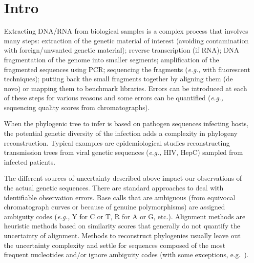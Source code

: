 \documentclass[
]{article}
\newcommand{\eg}{\textit{e.g.,}\xspace}
\begin{document}
\hypertarget{intro}{%
\section{Intro}\label{intro}}

Extracting DNA/RNA from biological samples is a complex process that
involves many steps: extraction of the genetic material of interest
(avoiding contamination with foreign/unwanted genetic material); reverse
transcription (if RNA); DNA fragmentation of the genome into smaller
segments; amplification of the fragmented sequences using PCR;
sequencing the fragments (\eg with fluorescent techniques); putting back
the small fragments together by aligning them (de novo) or mapping them
to benchmark libraries. Errors can be introduced at each of these steps
for various reasons
\citep[\citet{oraweAccountingUncertaintyDNA2015}]{beerenwinkelUltradeepSequencingAnalysis2011}
and some errors can be quantified (\eg sequencing quality scores from
chromatographs).

When the phylogenic tree to infer is based on pathogen sequences
infecting hosts, the potential genetic diversity of the infection adds a
complexity in phylogeny reconstruction. Typical examples are
epidemiological studies reconstructing transmission trees from viral
genetic sequences (\eg HIV, HepC) sampled from infected patients.

The different sources of uncertainty described above impact our
observations of the actual genetic sequences. There are standard
approaches to deal with identifiable observation errors. Base calls that
are ambiguous (from equivocal chromatograph curves or because of genuine
polymorphisms) are assigned ambiguity codes (\eg Y for C or T, R for A
or G, etc.). Alignment methods are heuristic methods based on similarity
scores that generally do not quantify the uncertainty of alignment.
Methods to reconstruct phylogenies usually leave out the uncertainty
complexity and settle for sequences composed of the most frequent
nucleotides and/or ignore ambiguity codes (with some exceptions,
e.g.~\citet{depristoFrameworkVariationDiscovery2011}).
\end{document}
